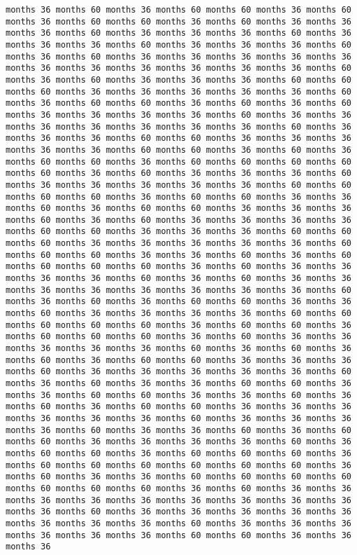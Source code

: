 \documentclass[11pt]{article}
\begin{document}
\begin{Verbatim}[commandchars=\\\{\}, frame=single, framerule=2mm, rulecolor=\color{outerrorbackground}]
months 36 months 60 months 36 months 60 months 60 months 36 months 60 months 36 months 60 months 60 months 36 months 60 months 36 months 36 months 36 months 60 months 36 months 36 months 36 months 60 months 36 months 36 months 36 months 60 months 36 months 36 months 36 months 60 months 36 months 60 months 36 months 36 months 36 months 36 months 36 months 36 months 36 months 36 months 36 months 36 months 36 months 60 months 36 months 60 months 36 months 36 months 36 months 60 months 60 months 60 months 36 months 36 months 36 months 36 months 36 months 60 months 36 months 60 months 60 months 36 months 60 months 36 months 60 months 36 months 36 months 36 months 36 months 60 months 36 months 36 months 36 months 36 months 36 months 36 months 36 months 60 months 36 months 36 months 36 months 60 months 60 months 36 months 36 months 36 months 36 months 36 months 60 months 60 months 36 months 60 months 36 months 60 months 60 months 36 months 60 months 60 months 60 months 60 months 60 months 36 months 60 months 36 months 36 months 36 months 60 months 36 months 36 months 36 months 36 months 36 months 60 months 60 months 60 months 60 months 36 months 60 months 60 months 36 months 36 months 60 months 36 months 60 months 60 months 36 months 36 months 36 months 60 months 36 months 60 months 36 months 36 months 36 months 36 months 60 months 60 months 36 months 36 months 36 months 60 months 60 months 60 months 36 months 36 months 36 months 36 months 36 months 60 months 60 months 60 months 36 months 36 months 60 months 36 months 60 months 60 months 60 months 60 months 36 months 60 months 36 months 36 months 36 months 36 months 60 months 36 months 60 months 36 months 36 months 36 months 36 months 36 months 36 months 36 months 36 months 60 months 36 months 60 months 36 months 60 months 60 months 36 months 36 months 60 months 36 months 36 months 36 months 36 months 60 months 60 months 60 months 60 months 60 months 36 months 60 months 60 months 36 months 60 months 60 months 60 months 36 months 60 months 36 months 36 months 36 months 36 months 36 months 60 months 36 months 60 months 36 months 60 months 36 months 60 months 60 months 36 months 36 months 36 months 60 months 36 months 36 months 36 months 36 months 36 months 60 months 36 months 60 months 36 months 36 months 60 months 60 months 36 months 36 months 60 months 60 months 36 months 36 months 60 months 36 months 60 months 36 months 60 months 60 months 36 months 36 months 36 months 36 months 36 months 36 months 60 months 36 months 36 months 36 months 36 months 60 months 36 months 36 months 60 months 36 months 60 months 60 months 36 months 36 months 36 months 36 months 60 months 36 months 60 months 60 months 36 months 60 months 60 months 60 months 36 months 60 months 60 months 60 months 60 months 60 months 60 months 36 months 60 months 36 months 36 months 60 months 60 months 60 months 60 months 60 months 60 months 60 months 36 months 60 months 36 months 36 months 36 months 36 months 36 months 36 months 36 months 36 months 36 months 36 months 60 months 36 months 36 months 36 months 36 months 36 months 36 months 36 months 36 months 60 months 36 months 36 months 36 months 36 months 36 months 36 months 60 months 60 months 36 months 36 months 36 
\end{Verbatim}
\end{document}
